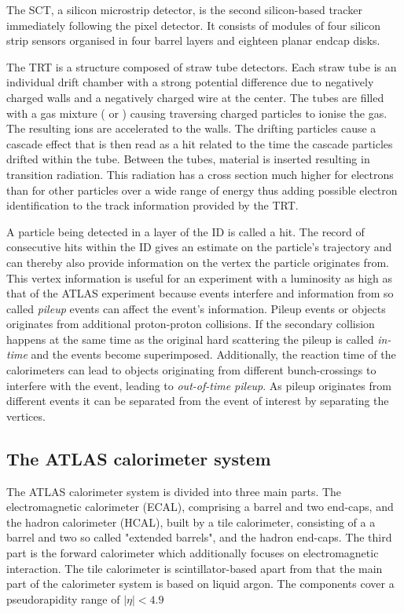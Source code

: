 The SCT, a silicon microstrip detector, is the second silicon-based tracker immediately following the pixel detector. It consists of modules of four silicon strip sensors organised in four barrel layers and eighteen planar endcap disks.

The TRT is a structure composed of straw tube detectors. Each straw tube is an individual drift chamber with a strong potential difference due to negatively charged walls and a negatively charged wire at the center. The tubes are filled with a gas mixture ( or ) causing traversing charged particles to ionise the gas. The resulting ions are accelerated to the walls. The drifting particles cause a cascade effect that is then read as a hit related to the time the cascade particles drifted within the tube.
Between the tubes, material is inserted resulting in transition radiation. This radiation has a cross section much higher for electrons than for other particles over a wide range of energy thus adding possible electron identification to the track information provided by the TRT.

A particle being detected in a layer of the ID is called a hit. The record of consecutive hits within the ID gives an estimate on the particle's trajectory and can thereby also provide information on the vertex the particle originates from. This vertex information is useful for an experiment with a luminosity as high as that of the ATLAS experiment because events interfere and information from so called \emph{pileup} events can affect the event's information. Pileup events or objects originates from additional proton-proton collisions. If the secondary collision happens at the same time as the original hard scattering the pileup is called \emph{in-time} and the events become superimposed. Additionally, the reaction time of the calorimeters can lead to objects originating from different bunch-crossings to interfere with the event, leading to \emph{out-of-time pileup}. As pileup originates from different events it can be separated from the event of interest by separating the vertices.

\subsection{The ATLAS calorimeter system}

The ATLAS calorimeter system is divided into three main parts. The electromagnetic calorimeter (ECAL), comprising a barrel and two end-caps, and the hadron calorimeter (HCAL), built by a tile calorimeter, consisting of a a barrel and two so called "extended barrels", and the hadron end-caps. The third part is the forward calorimeter which additionally focuses on electromagnetic interaction. The tile calorimeter is scintillator-based apart from that the main part of the calorimeter system is based on liquid argon. The components cover a pseudorapidity range of $|\eta| < 4.9$

